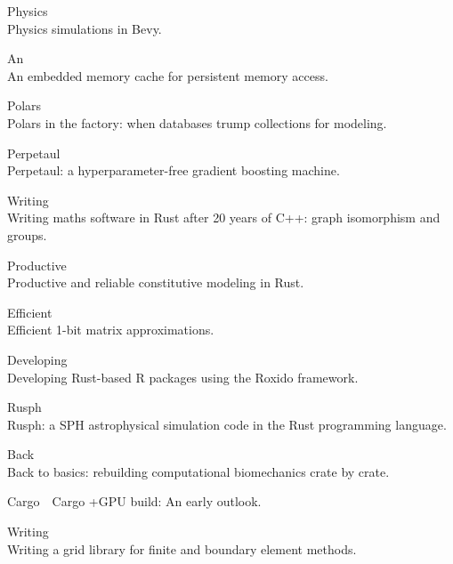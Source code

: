 \documentclass{article}
\begin{document}
Physics\\
Physics simulations in Bevy.

An\\
An embedded memory cache for persistent memory access.

Polars\\
Polars in the factory: when databases trump collections for modeling.

Perpetaul\\
Perpetaul: a hyperparameter-free gradient boosting machine.

Writing\\
Writing maths software in Rust after 20 years of C++: graph isomorphism and groups.

Productive\\
Productive and reliable constitutive modeling in Rust.

Efficient\\
Efficient 1-bit matrix approximations.

Developing\\
Developing Rust-based R packages using the Roxido framework.

Rusph\\
Rusph: a SPH astrophysical simulation code in the Rust programming language.

Back\\
Back to basics: rebuilding computational biomechanics crate by crate.

Cargo\ \ Cargo +GPU build: An early outlook.

Writing\\
Writing a grid library for finite and boundary element methods.
\end{document}

